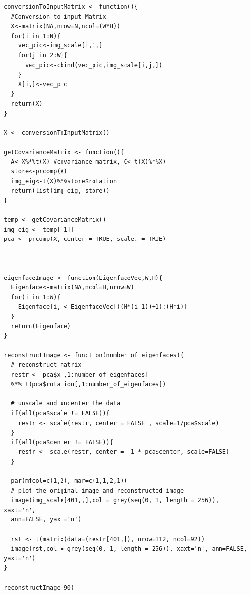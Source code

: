 \documentclass[a4paper,10pt]{article}
\begin{document}
\begin{verbatim}
conversionToInputMatrix <- function(){
  #Conversion to input Matrix
  X<-matrix(NA,nrow=N,ncol=(W*H))
  for(i in 1:N){
    vec_pic<-img_scale[i,1,]
    for(j in 2:W){
      vec_pic<-cbind(vec_pic,img_scale[i,j,])
    }
    X[i,]<-vec_pic
  }
  return(X)
}

X <- conversionToInputMatrix()

getCovarianceMatrix <- function(){
  A<-X%*%t(X) #covariance matrix, C<-t(X)%*%X)
  store<-prcomp(A)
  img_eig<-t(X)%*%store$rotation
  return(list(img_eig, store))
}

temp <- getCovarianceMatrix()
img_eig <- temp[[1]]
pca <- prcomp(X, center = TRUE, scale. = TRUE)



eigenfaceImage <- function(EigenfaceVec,W,H){
  Eigenface<-matrix(NA,ncol=H,nrow=W)
  for(i in 1:W){
    Eigenface[i,]<-EigenfaceVec[((H*(i-1))+1):(H*i)]
  }
  return(Eigenface)
}

reconstructImage <- function(number_of_eigenfaces){
  # reconstruct matrix
  restr <- pca$x[,1:number_of_eigenfaces]
  %*% t(pca$rotation[,1:number_of_eigenfaces])

  # unscale and uncenter the data
  if(all(pca$scale != FALSE)){
    restr <- scale(restr, center = FALSE , scale=1/pca$scale)
  }
  if(all(pca$center != FALSE)){
    restr <- scale(restr, center = -1 * pca$center, scale=FALSE)
  }

  par(mfcol=c(1,2), mar=c(1,1,2,1))
  # plot the original image and reconstructed image
  image(img_scale[401,,],col = grey(seq(0, 1, length = 256)), xaxt='n',
  ann=FALSE, yaxt='n')

  rst <- t(matrix(data=(restr[401,]), nrow=112, ncol=92))
  image(rst,col = grey(seq(0, 1, length = 256)), xaxt='n', ann=FALSE, yaxt='n')
}

reconstructImage(90)



\end{verbatim}
\end{document}

